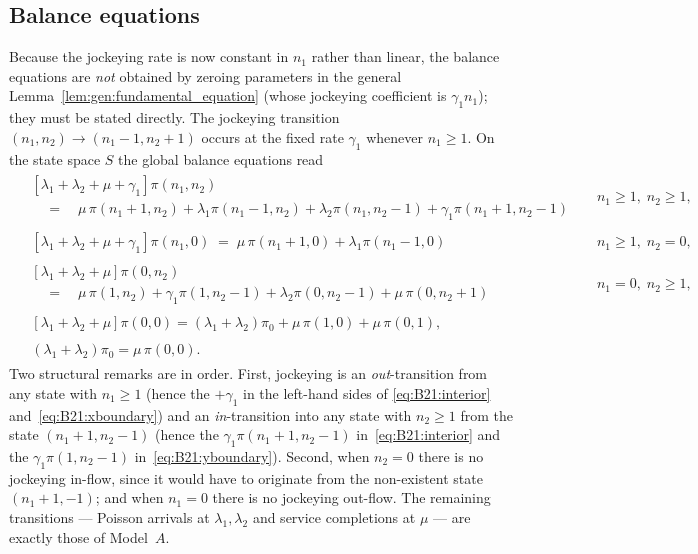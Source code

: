 \subsection{Balance equations}

Because the jockeying rate is now constant in $n_1$ rather than linear, the balance
equations are \emph{not} obtained by zeroing parameters in the general
Lemma~\ref{lem:gen:fundamental_equation} (whose jockeying coefficient is $\gamma_1 n_1$);
they must be stated directly. The jockeying transition $(n_1,n_2)\to(n_1-1,n_2+1)$ occurs
at the fixed rate $\gamma_1$ whenever $n_1\ge1$. On the state space $S$ the global balance
equations read
\begin{align}
    \begin{split}
        &\left[\lambda_1+\lambda_2+\mu+\gamma_1\right]\pi(n_1,n_2) \\
        &\quad=\quad \mu\,\pi(n_1+1,n_2)
          +\lambda_1\pi(n_1-1,n_2)
          +\lambda_2\pi(n_1,n_2-1)
          +\gamma_1\pi(n_1+1,n_2-1)
    \end{split}
    &&n_1\ge1,\;n_2\ge1, \label{eq:B21:interior} \\
    \begin{split}
        &\left[\lambda_1+\lambda_2+\mu+\gamma_1\right]\pi(n_1,0)
          \;=\; \mu\,\pi(n_1+1,0)
          +\lambda_1\pi(n_1-1,0)
    \end{split}
    &&n_1\ge1,\;n_2=0, \label{eq:B21:xboundary} \\
    \begin{split}
        &\left[\lambda_1+\lambda_2+\mu\right]\pi(0,n_2) \\
        &\quad=\quad \mu\,\pi(1,n_2)
          +\gamma_1\pi(1,n_2-1)
          +\lambda_2\pi(0,n_2-1)
          +\mu\,\pi(0,n_2+1)
    \end{split}
    &&n_1=0,\;n_2\ge1, \label{eq:B21:yboundary} \\
    \begin{split}
        &\left[\lambda_1+\lambda_2+\mu\right]\pi(0,0)
          = (\lambda_1+\lambda_2)\pi_0
          + \mu\,\pi(1,0)
          + \mu\,\pi(0,1),
    \end{split} &&\label{eq:B21:zero} \\
    \begin{split}
        &(\lambda_1+\lambda_2)\pi_0 = \mu\,\pi(0,0).
    \end{split} &&\label{eq:B21:idle}
\end{align}
Two structural remarks are in order. First, jockeying is an \emph{out}-transition from any
state with $n_1\ge1$ (hence the $+\gamma_1$ in the left-hand sides of
\eqref{eq:B21:interior} and~\eqref{eq:B21:xboundary}) and an \emph{in}-transition into any
state with $n_2\ge1$ from the state $(n_1+1,n_2-1)$ (hence the $\gamma_1\pi(n_1+1,n_2-1)$
in~\eqref{eq:B21:interior} and the $\gamma_1\pi(1,n_2-1)$ in~\eqref{eq:B21:yboundary}).
Second, when $n_2=0$ there is no jockeying in-flow, since it would have to originate from
the non-existent state $(n_1+1,-1)$; and when $n_1=0$ there is no jockeying out-flow. The
remaining transitions --- Poisson arrivals at $\lambda_1,\lambda_2$ and service
completions at $\mu$ --- are exactly those of Model~$A$.

